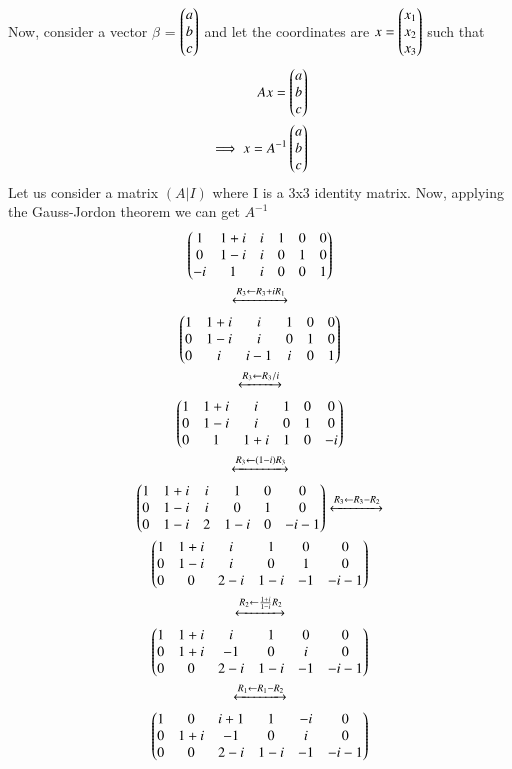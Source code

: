 Now, consider a vector $\beta$ = $\begin{pmatrix}a\\b\\c\end{pmatrix}$ and let the coordinates are $x=\begin{pmatrix}x_1\\x_2\\x_3\end{pmatrix}$ such that
\begin{align}
Ax = \begin{pmatrix}a\\b\\c\end{pmatrix}\\
\implies x = A^{-1} \begin{pmatrix}a\\b\\c\end{pmatrix}
\end{align}
Let us consider a matrix $(A | I)$ where I is a 3x3 identity matrix.
Now, applying the Gauss-Jordon theorem we can get $A^{-1}$
\begin{multline}
\myvec{1 & 1+i & i & 1 & 0 & 0\\0 & 1-i & i & 0 & 1 & 0\\-i & 1 & i & 0 & 0 & 1}\\\xleftrightarrow[]{R_3\leftarrow R_3+iR_1}\\
\myvec{1 & 1+i & i & 1 & 0 & 0\\0 & 1-i & i & 0 & 1 & 0\\0 & i & i-1 & i & 0 & 1}\\
\xleftrightarrow[]{R_3\leftarrow R_3/i}\\
\myvec{1 & 1+i & i & 1 & 0 & 0\\0 & 1-i & i & 0 & 1 & 0\\0 & 1 & 1+i & 1 & 0 & -i}\\
\xleftrightarrow[]{R_3\leftarrow (1-i)R_3}\\
\myvec{1 & 1+i & i &1 & 0 & 0\\0 & 1-i & i & 0 & 1 & 0\\0 & 1-i & 2 & 1-i & 0 & -i-1}\xleftrightarrow[]{R_3\leftarrow R_3-R_2}\\
\myvec{1 & 1+i & i&1 & 0 & 0\\0 & 1-i & i&0 & 1 & 0\\0 & 0 & 2-i & 1-i & -1 & -i-1}\\
\xleftrightarrow[]{R_2\leftarrow \frac{1+i}{1-i}R_2}\\
\myvec{1 & 1+i & i & 1 & 0 & 0\\0 & 1+i & -1 & 0 & i & 0\\0 & 0 & 2-i & 1-i & -1 & -i-1}\\
\xleftrightarrow[]{R_1\leftarrow R_1-R_2}\\
\myvec{1 & 0 & i+1 & 1 & -i & 0\\0 & 1+i & -1 & 0 & i & 0\\0 & 0 & 2-i & 1-i & -1 & -i-1}\\

\end{multline}
